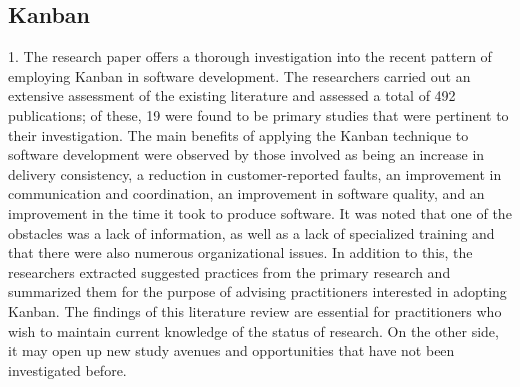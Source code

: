 \documentclass[conference]{IEEEtran}
\begin{document}
\begin{enumerate}
\end{enumerate}

\subsection{Kanban}
1. The research paper \cite{kanban1} offers a thorough investigation into the recent pattern of employing Kanban in software development. The researchers carried out an extensive assessment of the existing literature and assessed a total of 492 publications; of these, 19 were found to be primary studies that were pertinent to their investigation. The main benefits of applying the Kanban technique to software development were observed by those involved as being an increase in delivery consistency, a reduction in customer-reported faults, an improvement in communication and coordination, an improvement in software quality, and an improvement in the time it took to produce software. It was noted that one of the obstacles was a lack of information, as well as a lack of specialized training and that there were also numerous organizational issues.
\newline
In addition to this, the researchers  extracted suggested practices from the primary research and summarized them for the purpose of advising practitioners interested in adopting Kanban. The findings of this literature review are essential for practitioners who wish to maintain current knowledge of the status of research. On the other side, it may open up new study avenues and opportunities that have not been investigated before.
\end{document}
